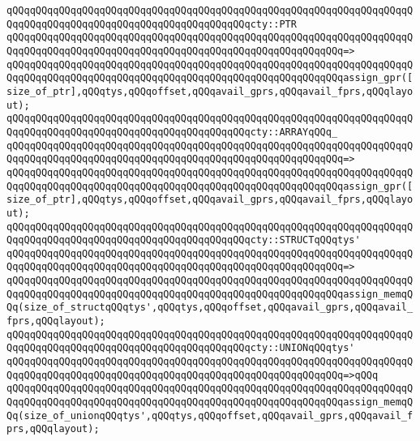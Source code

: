 \verb|qQQqqQQqqQQqqQQqqQQqqQQqqQQqqQQqqQQqqQQqqQQqqQQqqQQqqQQqqQQqqQQqqQQqqQQqqQQqqQQqqQQqqQQqqQQqqQQqqQQqqQQqqQQqqQQqcty::PTR|\newline
\verb|qQQqqQQqqQQqqQQqqQQqqQQqqQQqqQQqqQQqqQQqqQQqqQQqqQQqqQQqqQQqqQQqqQQqqQQqqQQqqQQqqQQqqQQqqQQqqQQqqQQqqQQqqQQqqQQqqQQqqQQqqQQqqQQq=>|\newline
\verb|qQQqqQQqqQQqqQQqqQQqqQQqqQQqqQQqqQQqqQQqqQQqqQQqqQQqqQQqqQQqqQQqqQQqqQQqqQQqqQQqqQQqqQQqqQQqqQQqqQQqqQQqqQQqqQQqqQQqqQQqqQQqqQQqassign_gpr([size_of_ptr],qQQqtys,qQQqoffset,qQQqavail_gprs,qQQqavail_fprs,qQQqlayout);|\newline
\newline
\verb|qQQqqQQqqQQqqQQqqQQqqQQqqQQqqQQqqQQqqQQqqQQqqQQqqQQqqQQqqQQqqQQqqQQqqQQqqQQqqQQqqQQqqQQqqQQqqQQqqQQqqQQqqQQqqQQqcty::ARRAYqQQq_|\newline
\verb|qQQqqQQqqQQqqQQqqQQqqQQqqQQqqQQqqQQqqQQqqQQqqQQqqQQqqQQqqQQqqQQqqQQqqQQqqQQqqQQqqQQqqQQqqQQqqQQqqQQqqQQqqQQqqQQqqQQqqQQqqQQqqQQq=>|\newline
\verb|qQQqqQQqqQQqqQQqqQQqqQQqqQQqqQQqqQQqqQQqqQQqqQQqqQQqqQQqqQQqqQQqqQQqqQQqqQQqqQQqqQQqqQQqqQQqqQQqqQQqqQQqqQQqqQQqqQQqqQQqqQQqqQQqassign_gpr([size_of_ptr],qQQqtys,qQQqoffset,qQQqavail_gprs,qQQqavail_fprs,qQQqlayout);|\newline
\newline
\verb|qQQqqQQqqQQqqQQqqQQqqQQqqQQqqQQqqQQqqQQqqQQqqQQqqQQqqQQqqQQqqQQqqQQqqQQqqQQqqQQqqQQqqQQqqQQqqQQqqQQqqQQqqQQqqQQqcty::STRUCTqQQqtys'|\newline
\verb|qQQqqQQqqQQqqQQqqQQqqQQqqQQqqQQqqQQqqQQqqQQqqQQqqQQqqQQqqQQqqQQqqQQqqQQqqQQqqQQqqQQqqQQqqQQqqQQqqQQqqQQqqQQqqQQqqQQqqQQqqQQqqQQq=>|\newline
\verb|qQQqqQQqqQQqqQQqqQQqqQQqqQQqqQQqqQQqqQQqqQQqqQQqqQQqqQQqqQQqqQQqqQQqqQQqqQQqqQQqqQQqqQQqqQQqqQQqqQQqqQQqqQQqqQQqqQQqqQQqqQQqqQQqassign_memqQQq(size_of_structqQQqtys',qQQqtys,qQQqoffset,qQQqavail_gprs,qQQqavail_fprs,qQQqlayout);|\newline
\newline
\verb|qQQqqQQqqQQqqQQqqQQqqQQqqQQqqQQqqQQqqQQqqQQqqQQqqQQqqQQqqQQqqQQqqQQqqQQqqQQqqQQqqQQqqQQqqQQqqQQqqQQqqQQqqQQqqQQqcty::UNIONqQQqtys'|\newline
\verb|qQQqqQQqqQQqqQQqqQQqqQQqqQQqqQQqqQQqqQQqqQQqqQQqqQQqqQQqqQQqqQQqqQQqqQQqqQQqqQQqqQQqqQQqqQQqqQQqqQQqqQQqqQQqqQQqqQQqqQQqqQQqqQQq=>qQQq|\newline
\verb|qQQqqQQqqQQqqQQqqQQqqQQqqQQqqQQqqQQqqQQqqQQqqQQqqQQqqQQqqQQqqQQqqQQqqQQqqQQqqQQqqQQqqQQqqQQqqQQqqQQqqQQqqQQqqQQqqQQqqQQqqQQqqQQqassign_memqQQq(size_of_unionqQQqtys',qQQqtys,qQQqoffset,qQQqavail_gprs,qQQqavail_fprs,qQQqlayout);|\newline
